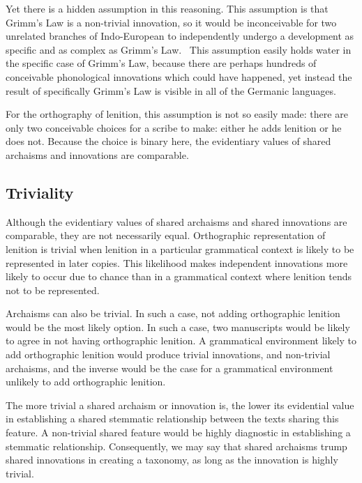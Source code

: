Yet there is a hidden assumption  in this reasoning. This assumption is that Grimm's Law is a non-trivial innovation, so it would be inconceivable for two unrelated branches of Indo-European to independently undergo a development as specific and as complex as Grimm's Law. \ This assumption easily holds water in the specific case of Grimm's Law, because there are perhaps hundreds of conceivable phonological innovations which could have happened, yet instead the result of specifically Grimm's Law is visible in all of the Germanic languages.

For the orthography of lenition, this assumption is not so easily made: there are only two conceivable choices for a scribe to make: either he adds lenition or he does not. Because the choice is binary here, the evidentiary values of shared archaisms and innovations are comparable.

\subsection{Triviality}
\label{sec:more-fund-disc}
Although the evidentiary values of shared archaisms and shared innovations are comparable, they are not necessarily equal. Orthographic representation of lenition is trivial when lenition in a particular grammatical context is likely to be represented in later copies. This likelihood makes independent innovations more likely to occur due to chance than in a grammatical context where lenition tends not to be represented.

Archaisms can also be trivial. In such a case, not adding orthographic lenition would be the most likely option. In such a case, two manuscripts would be likely to agree in not having orthographic lenition. A grammatical environment likely to add orthographic lenition would produce trivial innovations, and non-trivial archaisms, and the inverse would be the case for a grammatical environment unlikely to add orthographic lenition.

The more trivial a shared archaism or innovation is, the lower its evidential value in establishing a shared stemmatic relationship between the texts sharing this feature. A non-trivial shared feature would be highly diagnostic in establishing a stemmatic relationship. Consequently, we may say that shared archaisms trump shared innovations in creating a taxonomy, as long as the innovation is highly trivial.

